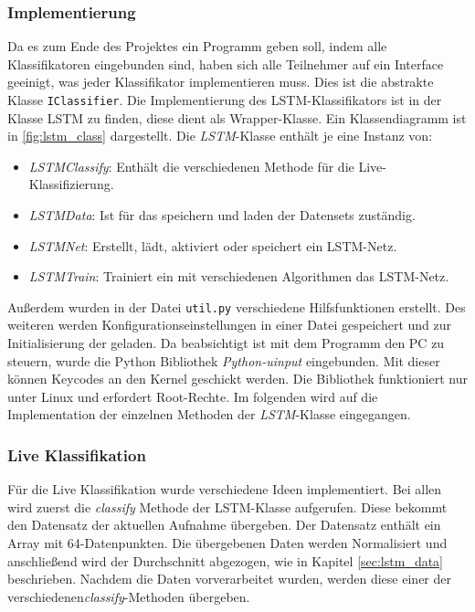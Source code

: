 \subsubsection{Implementierung}
Da es zum Ende des Projektes ein Programm geben soll, indem alle Klassifikatoren
eingebunden sind, haben sich alle Teilnehmer auf ein Interface geeinigt, was
jeder Klassifikator implementieren muss. Dies ist die abstrakte Klasse
\texttt{IClassifier}. Die Implementierung des \ac{LSTM}-Klassifikators ist in
der Klasse LSTM zu finden, diese dient als Wrapper-Klasse. Ein Klassendiagramm
ist in \autoref{fig:lstm_class} dargestellt. Die \textit{LSTM}-Klasse enthält je eine Instanz von: 
\begin{itemize}
\item \textit{LSTMClassify}: Enthält die verschiedenen Methode für die Live-Klassifizierung.
\item \textit{LSTMData}: Ist für das speichern und laden der Datensets zuständig.
\item \textit{LSTMNet}: Erstellt, lädt, aktiviert oder speichert ein LSTM-Netz.
\item \textit{LSTMTrain}: Trainiert ein mit verschiedenen Algorithmen das LSTM-Netz.
\end{itemize}
Außerdem wurden in der Datei \texttt{util.py} verschiedene Hilfsfunktionen
erstellt.
Des weiteren werden Konfigurationseinstellungen in einer Datei gespeichert und
zur Initialisierung der geladen.
Da beabsichtigt ist mit dem Programm den PC zu steuern, wurde die Python
Bibliothek \textit{Python-uinput} eingebunden. Mit dieser können
Keycodes an den Kernel geschickt werden.
Die Bibliothek funktioniert nur unter Linux und erfordert Root-Rechte.
Im folgenden wird auf die Implementation der einzelnen Methoden der
\textit{LSTM}-Klasse eingegangen.

\subsubsection*{Live Klassifikation}
Für die Live Klassifikation wurde verschiedene Ideen implementiert. 
Bei allen wird zuerst die \textit{classify} Methode der LSTM-Klasse 
aufgerufen. Diese bekommt den Datensatz der aktuellen Aufnahme übergeben. 
Der Datensatz enthält ein Array mit 64-Datenpunkten. Die übergebenen Daten werden 
Normalisiert und anschließend wird der Durchschnitt abgezogen, wie in Kapitel 
\autoref{sec:lstm_data} beschrieben. Nachdem die Daten vorverarbeitet wurden, 
werden diese einer der verschiedenen\textit{classify}-Methoden übergeben. 

